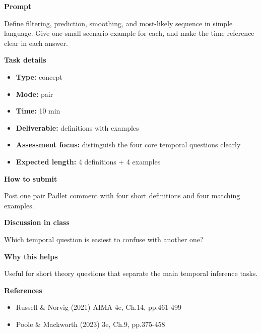 \documentclass[11pt]{article}
\begin{document}
\begin{tcolorbox}[colback=white,colframe=MidnightBlue,title={Q1 Core Concept Check},fonttitle=\bfseries,breakable]
\begin{center}
\end{center}

{\large\bfseries\color{MidnightBlue} Prompt}\par\medskip
Define filtering, prediction, smoothing, and most-likely sequence in simple language. Give one small scenario example for each, and make the time reference clear in each answer.

{\large\bfseries\color{MidnightBlue} Task details}\par\medskip
\begin{itemize}\item \textbf{Type:} concept
\item \textbf{Mode:} pair
\item \textbf{Time:} 10 min
\item \textbf{Deliverable:} definitions with examples
\item \textbf{Assessment focus:} distinguish the four core temporal questions clearly
\item \textbf{Expected length:} 4 definitions + 4 examples\end{itemize}

{\large\bfseries\color{MidnightBlue} How to submit}\par\medskip
Post one pair Padlet comment with four short definitions and four matching examples.

{\large\bfseries\color{MidnightBlue} Discussion in class}\par\medskip
Which temporal question is easiest to confuse with another one?

{\large\bfseries\color{MidnightBlue} Why this helps}\par\medskip
Useful for short theory questions that separate the main temporal inference tasks.

{\large\bfseries\color{MidnightBlue} References}\par\medskip
\begin{itemize}\item Russell \& Norvig (2021) AIMA 4e, Ch.14, pp.461-499
\item Poole \& Mackworth (2023) 3e, Ch.9, pp.375-458\end{itemize}
\end{tcolorbox}
\end{document}
